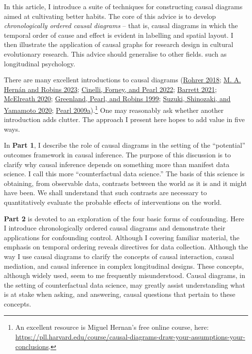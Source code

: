 \documentclass[
  singlecolumn]{report}
\begin{document}
In this article, I introduce a suite of techniques for constructing
causal diagrams aimed at cultivating better habits. The core of this
advice is to develop \emph{chronologically ordered causal diagrams} --
that is, causal diagrams in which the temporal order of cause and effect
is evident in labelling and spatial layout. I then illustrate the
application of causal graphs for research design in cultural
evolutionary research. This advice should generalise to other fields.
such as longitudinal psychology.

There are many excellent introductions to causal diagrams
(\protect\hyperlink{ref-rohrer2018}{Rohrer 2018};
\protect\hyperlink{ref-hernuxe1n2023a}{M. A. Hernán and Robins 2023};
\protect\hyperlink{ref-cinelli2022}{Cinelli, Forney, and Pearl 2022};
\protect\hyperlink{ref-barrett2021}{Barrett 2021};
\protect\hyperlink{ref-mcelreath2020}{McElreath 2020};
\protect\hyperlink{ref-greenland1999}{Greenland, Pearl, and Robins
1999}; \protect\hyperlink{ref-suzuki2020}{Suzuki, Shinozaki, and
Yamamoto 2020}; \protect\hyperlink{ref-pearl2009}{Pearl
2009a}).\footnote{An excellent resource is Miguel Hernan's free online
  course, here:
  \url{https://pll.harvard.edu/course/causal-diagrams-draw-your-assumptions-your-conclusions}.}
One may reasonably ask whether another introduction adds clutter. The
approach I present here hopes to add value in five ways.

In \textbf{Part 1}, I describe the role of causal diagrams in the
setting of the ``potential'' outcomes framework in causal inference. The
purpose of this discussion is to clarify why causal inference depends on
something more than manifest data science. I call this more
``counterfactual data science.'' The basis of this science is obtaining,
from observable data, contrasts between the world as it is and it might
have been. We shall understand that such contrasts are necessary to
quantitatively evaluate the probable effects of interventions on the
world.

\textbf{Part 2} is devoted to an exploration of the four basic forms of
confounding. Here I introduce chronologically ordered causal diagrams
and demonstrate their applications for confounding control. Although I
covering familiar material, the emphasis on temporal ordering reveals
directives for data collection. Although the way I use causal diagrams
to clarify the concepts of causal interaction, causal mediation, and
causal inference in complex longitudinal designs. These concepts,
although widely used, seem to me frequently misunderstood. Causal
diagrams, in the setting of counterfactual data science, may greatly
assist understanding what is at stake when asking, and answering, causal
questions that pertain to these concepts.
\end{document}
